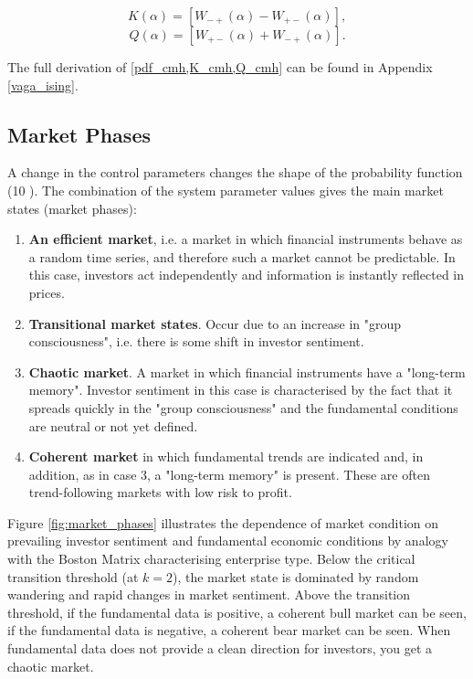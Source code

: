 \begin{equation}
	\label{K_cmh}
	K(\alpha) = [ W_{-+}(\alpha) - W_{+-}(\alpha) ],
\end{equation}
\begin{equation}
	\label{Q_cmh}
	Q(\alpha) = [ W_{+-} (\alpha) + W_{-+} (\alpha) ].
\end{equation}

The full derivation of \cref{pdf_cmh,K_cmh,Q_cmh} can be found in Appendix \ref{vaga_ising}.

\subsection{Market Phases}
 
 A change in the control parameters changes the shape of the probability function (10 ). The combination of the system parameter values gives the main market states (market phases):
 
\begin{enumerate}
	\item \textbf{An efficient market}, i.e. a market in which financial instruments behave as a random time series, and therefore such a market cannot be predictable. In this case, investors act independently and information is instantly reflected in prices. 
 
	\item \textbf{Transitional market states}. Occur due to an increase in "group consciousness", i.e. there is some shift in investor sentiment.

	\item \textbf{Chaotic market}. A market in which financial instruments have a "long-term memory". Investor sentiment in this case is characterised by the fact that it spreads quickly in the "group consciousness" and the fundamental conditions are neutral or not yet defined.

	\item \textbf{Coherent market} in which fundamental trends are indicated and, in addition, as in case 3, a "long-term memory" is present. These are often trend-following markets with low risk to profit.
\end{enumerate}
 

Figure \ref{fig:market_phases} illustrates the dependence of market condition on prevailing investor sentiment and fundamental economic conditions by analogy with the Boston Matrix characterising enterprise type. Below the critical transition threshold (at $k=2$), the market state is dominated by random wandering and rapid changes in market sentiment. Above the transition threshold, if the fundamental data is positive, a coherent bull market can be seen, if the fundamental data is negative, a coherent bear market can be seen. When fundamental data does not provide a clean direction for investors, you get a chaotic market.


